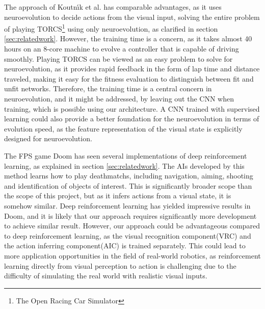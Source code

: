 The approach of Koutn\'{\i}k et al.\cite{torcs} has comparable advantages, as it uses neuroevolution to decide actions from the visual input, solving the entire problem of playing TORCS\footnote{The Open Racing Car Simulator} using only neuroevolution, as clarified in section \ref{sec:relatedwork}. However, the training time is a concern, as it takes almost 40 hours on an 8-core machine to evolve a controller that is capable of driving smoothly. Playing TORCS can be viewed as an easy problem to solve for neuroevolution, as it provides rapid feedback in the form of lap time and distance traveled, making it easy for the fitness evaluation to distinguish between fit and unfit networks. Therefore, the training time is a central concern in neuroevolution, and it might be addressed, by leaving out the CNN when training, which is possible using our architecture. A CNN trained with supervised learning could also provide a better foundation for the neuroevolution in terms of evolution speed, as the feature representation of the visual state is explicitly designed for neuroevolution.

The FPS game Doom has seen several implementations of deep reinforcement learning, as explained in section \ref{sec:relatedwork}. The AIs developed by this method learns how to play deathmatchs, including navigation, aiming, shooting and identification of objects of interest. This is significantly broader scope than the scope of this project, but as it infers actions from a visual state, it is somehow similar. Deep reinforcement learning has yielded impressive results in Doom, and it is likely that our approach requires significantly more development to achieve similar result. However, our approach could be advantageous compared to deep reinforcement learning, as the visual recognition component(VRC) and the action inferring component(AIC) is trained separately. This could lead to more application opportunities in the field of real-world robotics, as reinforcement learning directly from visual perception to action is challenging due to the difficulty of simulating the real world with realistic visual inputs.

